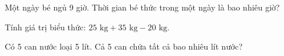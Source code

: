 \begin{ex}
Một ngày bé ngủ 9 giờ. Thời gian bé thức trong một ngày là bao nhiêu giờ?
\end{ex}

\begin{ex}
Tính giá trị biểu thức: $25\text{ kg} + 35\text{ kg} - 20\text{ kg}$.
\end{ex}

\begin{ex}
Có 5 can nước loại 5 lít. Cả 5 can chứa tất cả bao nhiêu lít nước?
\end{ex}
